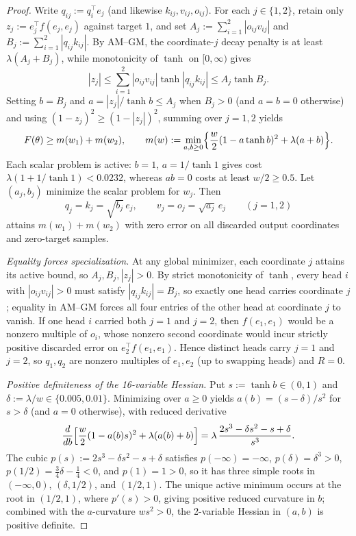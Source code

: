 \documentclass[11pt]{article}
\theoremstyle{plain}
\theoremstyle{definition}
\theoremstyle{remark}
\begin{document}
\begin{proof}
Write $q_{ij} := q_i^\top e_j$ (and likewise $k_{ij}, v_{ij}, o_{ij}$). For each $j \in \{1, 2\}$, retain only $z_j := e_j^\top f(e_j, e_j)$ against target $1$, and set $A_j := \sum_{i=1}^2 |o_{ij} v_{ij}|$ and $B_j := \sum_{i=1}^2 |q_{ij} k_{ij}|$. By AM--GM, the coordinate-$j$ decay penalty is at least $\lambda(A_j + B_j)$, while monotonicity of $\tanh$ on $[0, \infty)$ gives
\[
|z_j| \le \sum_{i=1}^2 |o_{ij} v_{ij}| \tanh |q_{ij} k_{ij}| \le A_j \tanh B_j.
\]
Setting $b = B_j$ and $a = |z_j|/\tanh b \le A_j$ when $B_j > 0$ (and $a = b = 0$ otherwise) and using $(1 - z_j)^2 \ge (1 - |z_j|)^2$, summing over $j = 1, 2$ yields
\begin{equation}\label{eq:lower-bound}
F(\theta) \ge m(w_1) + m(w_2), \qquad
m(w) := \min_{a,b \ge 0}\Bigl\{\frac{w}{2}(1 - a\tanh b)^2 + \lambda(a + b)\Bigr\}.
\end{equation}
Each scalar problem is active: $b = 1$, $a = 1/\tanh 1$ gives cost $\lambda(1 + 1/\tanh 1) < 0.0232$, whereas $ab = 0$ costs at least $w/2 \ge 0.5$. Let $(a_j, b_j)$ minimize the scalar problem for $w_j$. Then
\begin{equation}\label{eq:min-param}
q_j = k_j = \sqrt{b_j}\,e_j, \qquad v_j = o_j = \sqrt{a_j}\,e_j \qquad (j = 1, 2)
\end{equation}
attains $m(w_1) + m(w_2)$ with zero error on all discarded output coordinates and zero-target samples.

\emph{Equality forces specialization.} At any global minimizer, each coordinate $j$ attains its active bound, so $A_j, B_j, |z_j| > 0$. By strict monotonicity of $\tanh$, every head $i$ with $|o_{ij} v_{ij}| > 0$ must satisfy $|q_{ij} k_{ij}| = B_j$, so exactly one head carries coordinate $j$; equality in AM--GM forces all four entries of the other head at coordinate $j$ to vanish. If one head $i$ carried both $j = 1$ and $j = 2$, then $f(e_1, e_1)$ would be a nonzero multiple of $o_i$, whose nonzero second coordinate would incur strictly positive discarded error on $e_2^\top f(e_1, e_1)$. Hence distinct heads carry $j = 1$ and $j = 2$, so $q_1, q_2$ are nonzero multiples of $e_1, e_2$ (up to swapping heads) and $R = 0$.

\emph{Positive definiteness of the 16-variable Hessian.} Put $s := \tanh b \in (0, 1)$ and $\delta := \lambda/w \in \{0.005, 0.01\}$. Minimizing over $a \ge 0$ yields $a(b) = (s - \delta)/s^2$ for $s > \delta$ (and $a = 0$ otherwise), with reduced derivative
\[
\frac{d}{db}\Bigl[\frac{w}{2}(1 - a(b)s)^2 + \lambda(a(b) + b)\Bigr]
= \lambda\,\frac{2s^3 - \delta s^2 - s + \delta}{s^3}.
\]
The cubic $p(s) := 2s^3 - \delta s^2 - s + \delta$ satisfies $p(-\infty) = -\infty$, $p(\delta) = \delta^3 > 0$, $p(1/2) = \frac{3}{4}\delta - \frac{1}{4} < 0$, and $p(1) = 1 > 0$, so it has three simple roots in $(-\infty, 0)$, $(\delta, 1/2)$, and $(1/2, 1)$. The unique active minimum occurs at the root in $(1/2, 1)$, where $p'(s) > 0$, giving positive reduced curvature in $b$; combined with the $a$-curvature $ws^2 > 0$, the 2-variable Hessian in $(a, b)$ is positive definite.


\end{proof}
\end{document}
